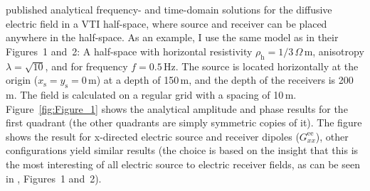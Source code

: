 \documentclass[manuscript,revised]{geophysics}
\begin{document}
\cite{PIER.10.Slob} published analytical frequency- and time-domain solutions
for the diffusive electric field in a VTI half-space, where source and receiver
can be placed anywhere in the half-space. As an example, I use the same model
as \cite{GEO.15.Hunziker} in their Figures~1 and~2: A half-space with
horizontal resistivity $\rho_\mathrm{h} = 1/3\,\Omega$\,m, anisotropy $\lambda
= \sqrt{10}$, and for frequency $f = 0.5\,$Hz. The source is located
horizontally at the origin ($x_\mathrm{s} = y_\mathrm{s} = 0\,$m) at a depth of
150\,m, and the depth of the receivers is 200\,m. The field is calculated on a
regular grid with a spacing of 10\,m. Figure~\ref{fig:Figure_1} shows the
analytical amplitude and phase results for the first quadrant (the other
quadrants are simply symmetric copies of it).
%
%
The figure shows the result for x-directed electric source and receiver dipoles
($G^\mathrm{ee}_{xx}$), other configurations yield similar results (the choice
is based on the insight that this is the most interesting of all electric
source to electric receiver fields, as can be seen in \cite{GEO.15.Hunziker},
Figures~1 and~2).
\end{document}
